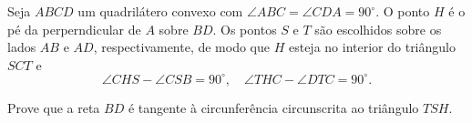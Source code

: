 Seja $ABCD$ um quadrilátero convexo com $\angle ABC = \angle CDA = 90^{\circ}$. O ponto $H$ é o pé da perperndicular de $A$ sobre $BD$. Os pontos $S$ e $T$ são escolhidos sobre os lados $AB$ e $AD$, respectivamente, de modo que $H$ esteja no interior do triângulo $SCT$ e \[ \angle CHS - \angle CSB = 90^{\circ}, \quad \angle THC - \angle DTC = 90^{\circ}. \]

Prove que a reta $BD$ é tangente à circunferência circunscrita ao triângulo $TSH$.
